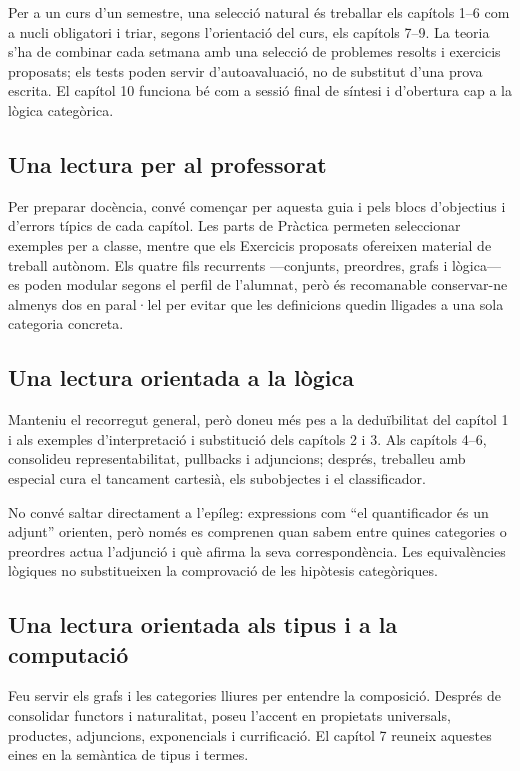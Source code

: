 Per a un curs d'un semestre, una selecció natural és treballar els capítols 1--6 com a nucli obligatori i triar, segons l'orientació del curs, els capítols 7--9. La teoria s'ha de combinar cada setmana amb una selecció de problemes resolts i exercicis proposats; els tests poden servir d'autoavaluació, no de substitut d'una prova escrita. El capítol 10 funciona bé com a sessió final de síntesi i d'obertura cap a la lògica categòrica.

\subsection*{Una lectura per al professorat}

Per preparar docència, convé començar per aquesta guia i pels blocs d'objectius i d'errors típics de cada capítol. Les parts de Pràctica permeten seleccionar exemples per a classe, mentre que els Exercicis proposats ofereixen material de treball autònom. Els quatre fils recurrents ---conjunts, preordres, grafs i lògica--- es poden modular segons el perfil de l'alumnat, però és recomanable conservar-ne almenys dos en paral·lel per evitar que les definicions quedin lligades a una sola categoria concreta.

\subsection*{Una lectura orientada a la lògica}

Manteniu el recorregut general, però doneu més pes a la
deduïbilitat del capítol 1 i als exemples d'interpretació
i substitució dels capítols 2 i 3. Als capítols 4--6,
consolideu representabilitat, pullbacks i adjuncions;
després, treballeu amb especial cura el tancament cartesià,
els subobjectes i el classificador.

No convé saltar directament a l'epíleg: expressions com
\enquote{el quantificador és un adjunt} orienten, però només es
comprenen quan sabem entre quines categories o preordres
actua l'adjunció i què afirma la seva correspondència.
Les equivalències lògiques no substitueixen la comprovació
de les hipòtesis categòriques.

\subsection*{Una lectura orientada als tipus i a la computació}

Feu servir els grafs i les categories lliures per entendre
la composició. Després de consolidar functors i naturalitat,
poseu l'accent en propietats universals, productes,
adjuncions, exponencials i currificació. El capítol 7
reuneix aquestes eines en la semàntica de tipus i termes.

